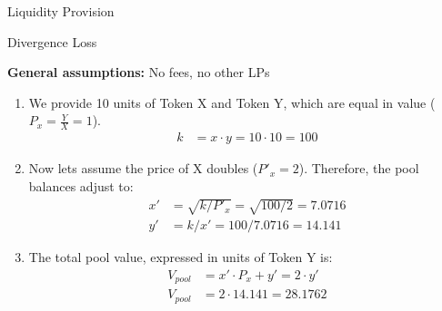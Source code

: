 \documentclass[]{beamer}
\begin{document}
\begin{frame}{Liquidity Provision}
	\begin{figure}[h!]
		\begin{center}
			
		\end{center}
	\end{figure}
\end{frame}


\begin{frame}{Divergence Loss}

	\textbf{General assumptions:} No fees, no other LPs \\ 
		\begin{enumerate}
			\item We provide 10 units of Token X and Token Y, which are equal in value ($P_x = \tfrac{Y}{X} = 1$).
				\begin{align*}
					k &= x \cdot y = 10 \cdot 10 = 100	
				\end{align*}
			\item Now lets assume the price of X doubles ($P'_x = 2$). Therefore, the pool balances adjust to:
				\begin{align*}
					x' &= \sqrt{k/P'_{x}}	 = \sqrt{100/2} = 7.0716\\
					y' &= k / x' = 100 / 7.0716 = 14.141
				\end{align*}
			\item The total pool value, expressed in units of Token Y is: 
				\begin{align*}
					V_{pool} &= x' \cdot P_x + y' = 2 \cdot y'\\
					V_{pool} &= 2 \cdot 14.141 = 28.1762
				\end{align*}
		\end{enumerate}	
\end{frame}
\end{document}
